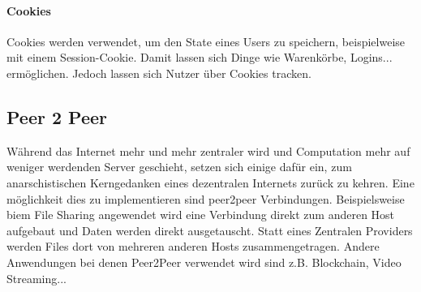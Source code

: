		\paragraph{Cookies}
			Cookies werden verwendet, um den State eines Users zu speichern, beispielweise mit einem Session-Cookie. Damit lassen sich Dinge wie Warenkörbe, Logins... ermöglichen. Jedoch lassen sich Nutzer über Cookies tracken.
	
	\subsection{Peer 2 Peer}
		Während das Internet mehr und mehr zentraler wird und Computation mehr auf weniger werdenden Server geschieht, setzen sich einige dafür ein, zum anarschistischen Kerngedanken eines dezentralen Internets zurück zu kehren. Eine möglichkeit dies zu implementieren sind peer2peer Verbindungen. Beispielsweise biem File Sharing angewendet wird eine Verbindung direkt zum anderen Host aufgebaut und Daten werden direkt ausgetauscht. Statt eines Zentralen Providers werden Files dort von mehreren anderen Hosts zusammengetragen. Andere Anwendungen bei denen Peer2Peer verwendet wird sind z.B. Blockchain, Video Streaming... 